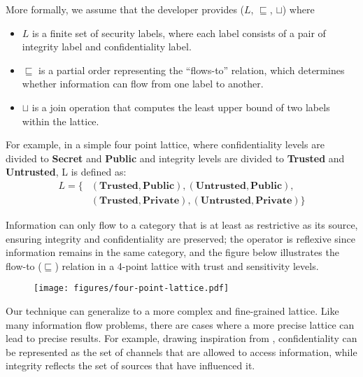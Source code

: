 More formally, we assume that the developer provides ($L$, $\sqsubseteq$, $\sqcup$) where 
\begin{itemize}[noitemsep]
    \item $L$ is a finite set of security labels, where each label consists of a pair of integrity label and confidentiality label. 
    \item $\sqsubseteq$ is a partial order representing the “flows-to” relation, which determines whether information can flow from one label to another. 
    \item $\sqcup$ is a join operation that computes the least upper bound of two labels within the lattice.
\end{itemize}
For example, in a simple four point lattice, where confidentiality levels are divided to \textbf{Secret} and \textbf{Public} and integrity levels are divided to \textbf{Trusted} and \textbf{Untrusted}, L is defined as:
{
\setlength{\abovedisplayskip}{2pt}
\setlength{\belowdisplayskip}{2pt}
\begin{equation}
  \begin{aligned}
    L =  \{&(\textbf{Trusted}, \textbf{Public}),(\textbf{Untrusted}, \textbf{Public}), \\
      & (\textbf{Trusted}, 
\textbf{Private}), (\textbf{Untrusted}, \textbf{Private})\}
  \end{aligned}
\end{equation}
}

Information can only flow to a category that is at least as restrictive as its source, ensuring integrity and confidentiality are preserved; the operator is reflexive since information remains in the same category, and the figure below illustrates the flow-to ($\sqsubseteq$) relation in a 4-point lattice with trust and sensitivity levels.

\vspace*{-1.5em}
\begin{figure}[H]
\centering
\texttt{[image: figures/four-point-lattice.pdf]}
\end{figure}
\vspace*{-1.5em}

Our technique can generalize to a more complex and fine-grained lattice. Like many information flow problems, there are cases where a more precise lattice can lead to precise results. For example, drawing inspiration from \cite{ML00}, confidentiality can be represented as the set of channels that are allowed to access information, while integrity reflects the set of sources that have influenced it. 

